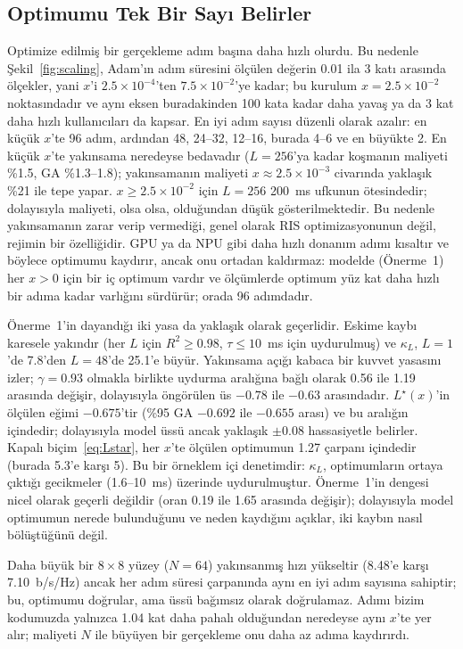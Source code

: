 \subsection{Optimumu Tek Bir Sayı Belirler}
\label{sec:res_scaling}
Optimize edilmiş bir gerçekleme adım başına daha hızlı olurdu. Bu nedenle Şekil~\ref{fig:scaling}, Adam'ın adım süresini ölçülen değerin 0.01 ila 3 katı arasında ölçekler, yani $x$'i $2.5\times10^{-4}$'ten $7.5\times10^{-2}$'ye kadar; bu kurulum $x=2.5\times10^{-2}$ noktasındadır ve aynı eksen buradakinden 100 kata kadar daha yavaş ya da 3 kat daha hızlı kullanıcıları da kapsar. En iyi adım sayısı düzenli olarak azalır: en küçük $x$'te 96 adım, ardından 48, 24--32, 12--16, burada 4--6 ve en büyükte 2. En küçük $x$'te yakınsama neredeyse bedavadır ($L=256$'ya kadar koşmanın maliyeti \%1.5, GA \%1.3--1.8); yakınsamanın maliyeti $x\approx 2.5\times10^{-3}$ civarında yaklaşık \%21 ile tepe yapar. $x\ge 2.5\times10^{-2}$ için $L=256$ 200~ms ufkunun ötesindedir; dolayısıyla maliyeti, olsa olsa, olduğundan düşük gösterilmektedir. Bu nedenle yakınsamanın zarar verip vermediği, genel olarak RIS optimizasyonunun değil, rejimin bir özelliğidir. GPU ya da NPU gibi daha hızlı donanım adımı kısaltır ve böylece optimumu kaydırır, ancak onu ortadan kaldırmaz: modelde (Önerme~1) her $x>0$ için bir iç optimum vardır ve ölçümlerde optimum yüz kat daha hızlı bir adıma kadar varlığını sürdürür; orada 96 adımdadır.

Önerme~1'in dayandığı iki yasa da yaklaşık olarak geçerlidir. Eskime kaybı karesele yakındır (her $L$ için $R^2\ge 0.98$, $\tau\le 10$~ms için uydurulmuş) ve $\kappa_L$, $L=1$'de 7.8'den $L=48$'de 25.1'e büyür. Yakınsama açığı kabaca bir kuvvet yasasını izler; $\gamma=0.93$ olmakla birlikte uydurma aralığına bağlı olarak 0.56 ile 1.19 arasında değişir, dolayısıyla öngörülen üs $-0.78$ ile $-0.63$ arasındadır. $L^\star(x)$'in ölçülen eğimi $-0.675$'tir (\%95 GA $-0.692$ ile $-0.655$ arası) ve bu aralığın içindedir; dolayısıyla model üssü ancak yaklaşık $\pm 0.08$ hassasiyetle belirler. Kapalı biçim~\eqref{eq:Lstar}, her $x$'te ölçülen optimumun 1.27 çarpanı içindedir (burada 5.3'e karşı 5). Bu bir örneklem içi denetimdir: $\kappa_L$, optimumların ortaya çıktığı gecikmeler (1.6--10~ms) üzerinde uydurulmuştur. Önerme~1'in dengesi nicel olarak geçerli değildir (oran 0.19 ile 1.65 arasında değişir); dolayısıyla model optimumun nerede bulunduğunu ve neden kaydığını açıklar, iki kaybın nasıl bölüştüğünü değil.

Daha büyük bir $8\times 8$ yüzey ($N=64$) yakınsanmış hızı yükseltir (8.48'e karşı 7.10~b/s/Hz) ancak her adım süresi çarpanında aynı en iyi adım sayısına sahiptir; bu, optimumu doğrular, ama üssü bağımsız olarak doğrulamaz. Adımı bizim kodumuzda yalnızca 1.04 kat daha pahalı olduğundan neredeyse aynı $x$'te yer alır; maliyeti $N$ ile büyüyen bir gerçekleme onu daha az adıma kaydırırdı.

